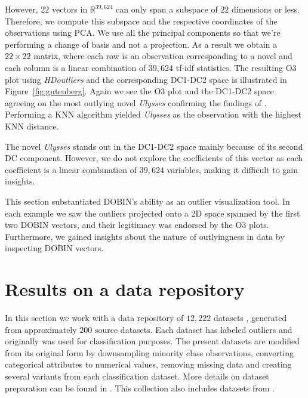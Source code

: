 \documentclass[letter,12pt]{article}
\begin{document}
However, $22$ vectors in $\mathbb{R}^{39,624}$ can only span a subspace of $22$ dimensions or less. Therefore, we compute this subspace and the respective coordinates of the observations using PCA\@. We use all the principal components so that we're performing a change of basis and not a projection. As a result we obtain a $22\times 22$ matrix, where each row is an observation corresponding to a novel and each column is a linear combination of $39,624$ tf-idf statistics. The resulting O3 plot using \textit{HDoutliers} and the corresponding DC1-DC2 space is illustrated in Figure~\ref{fig:gutenberg}. Again we see the O3 plot and the DC1-DC2 space agreeing on the most outlying novel \textit{Ulysses} confirming the findings of \cite{wilkinson2017visualizing}. Performing a KNN algorithm yielded \textit{Ulysses} as the observation with the highest KNN distance.

The novel \textit{Ulysses} stands out in the DC1-DC2 space mainly because of its second DC component. However, we do not explore the coefficients of this vector as each coefficient is a linear combination of $39,624$ variables, making it difficult to gain insights.

This section substantiated DOBIN's ability as an outlier visualization tool. In each example we saw the outliers projected onto a 2D space spanned by the first two DOBIN vectors, and their legitimacy was endorsed by the O3 plots. Furthermore, we gained insights about the nature of outlyingness in data by inspecting DOBIN vectors.

\section{Results on a data repository}\label{sec:DatRepo}

In this section we work with a data repository of $12,222$ datasets \citep{datasets}, generated from approximately $200$ source datasets. Each dataset has labeled outliers and originally was used for classification purposes. The present datasets are modified from its original form by downsampling minority class observations, converting categorical attributes to numerical values, removing missing data and creating several variants from each classification dataset. More details on dataset preparation can be found in \cite{kandanaarachchi2018normalization}. This collection also includes datasets from \cite{campos2016evaluation}.
\end{document}
